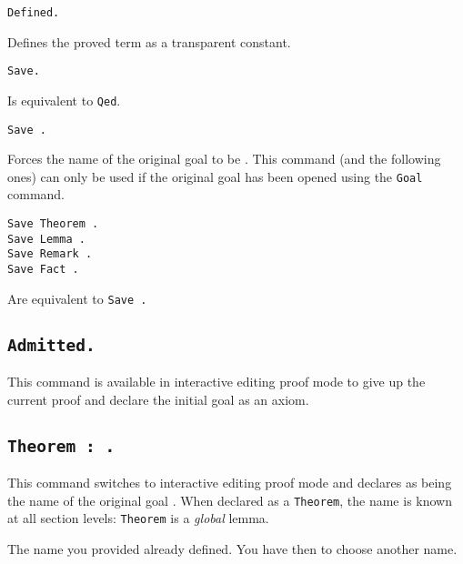 \begin{Variants}

\item {\tt Defined.}
\label{Defined} 

  Defines the proved term as a transparent constant.

\item {\tt Save.}

  Is equivalent to {\tt Qed}.

\item {\tt Save {\ident}.}
  
  Forces the name of the original goal to be {\ident}.  This command
  (and the following ones) can only be used if the original goal has
  been opened using the {\tt Goal} command.

\item {\tt Save Theorem {\ident}.} \\
 {\tt Save Lemma {\ident}.} \\
 {\tt Save Remark {\ident}.}\\
 {\tt Save Fact {\ident}.}

  Are equivalent to {\tt Save {\ident}.} 
\end{Variants}

\subsection{\tt Admitted.}\label{Admitted}
This command is available in interactive editing proof mode to give up
the current proof and declare the initial goal as an axiom.

\subsection{\tt Theorem {\ident} : {\form}.}
\label{Theorem}

This command switches to interactive editing proof mode and declares
{\ident} as being the name of the original goal {\form}. When declared
as a {\tt Theorem}, the name {\ident} is known at all section levels:
{\tt Theorem} is a {\sl global} lemma.


\begin{ErrMsgs}

\item {}

\item {}
 
  The name you provided already defined. You have then to choose
  another name.

\end{ErrMsgs}


